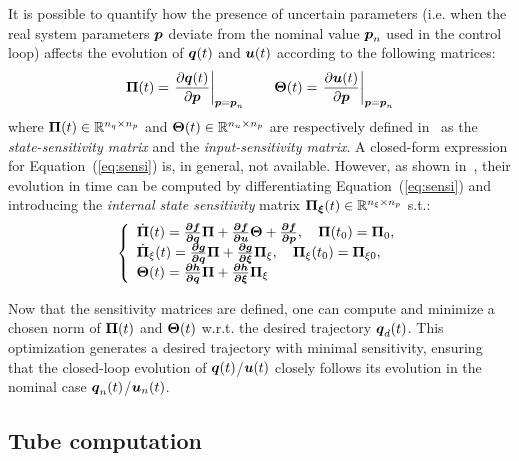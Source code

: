It is possible to quantify how the presence of uncertain parameters (i.e. when the real system parameters $\boldsymbol{p}$ deviate from the nominal value $\boldsymbol{p}_n$ used in the control loop) affects the evolution of $\boldsymbol{q}(t)$ and $\boldsymbol{u}(t)$ according to the following matrices:
\begin{equation}\label{eq:sensi}
  \boldsymbol{\Pi}(t)=\left.\frac{\partial \boldsymbol{q}(t)}{\partial \boldsymbol{p}}\right|_{\boldsymbol{p}=\boldsymbol{p}_n} \quad\quad \boldsymbol{\Theta}(t)=\left.\frac{\partial \boldsymbol{u}(t)}{\partial \boldsymbol{p}}\right|_{\boldsymbol{p}=\boldsymbol{p}_n}
\end{equation}
where $\boldsymbol{\Pi}(t)\in \mathbb{R}^{n_q \times n_p}$ and $\boldsymbol{\Theta}(t)\in \mathbb{R}^{n_u \times n_p}$ are respectively defined in~\cite{cPi,cTh} as the \emph{state-sensitivity matrix} and the \emph{input-sensitivity matrix}.
A closed-form expression for Equation~(\ref{eq:sensi}) is, in general, not available. 
However, as shown in~\cite{cPi,cTh}, their evolution in time can be computed by differentiating Equation~(\ref{eq:sensi}) and introducing the \emph{internal state sensitivity} matrix $\boldsymbol{\Pi_{\xi}}(t)\in \mathbb{R}^{n_{\xi} \times n_p}$ s.t.:
\begin{equation}\label{eq:dyna_sensi}
  \left \{
  \begin{array}{l l l}
       \dot{\boldsymbol{\Pi}}(t) = \boldsymbol{\frac{\partial{f}}{\partial{q}}}\boldsymbol{\Pi}+ \boldsymbol{\frac{\partial{f}}{\partial{u}}}\boldsymbol{\Theta}+ \boldsymbol{\frac{\partial{f}}{\partial{p}}}, \quad \boldsymbol{\Pi}(t_0)=\boldsymbol{\Pi}_0, \\
       \dot{\boldsymbol{\Pi}}_{\xi}(t) = \boldsymbol{\frac{\partial{g}}{\partial{q}}}\boldsymbol{\Pi}+ \boldsymbol{\frac{\partial{g}}{\partial{\xi}}}\boldsymbol{\Pi}_{\xi}, \quad \boldsymbol{\Pi}_{\xi}(t_0)=\boldsymbol{\Pi}_{\xi0}, \\
       \boldsymbol{\Theta}(t) = \boldsymbol{\frac{\partial{h}}{\partial{q}}}\boldsymbol{\Pi}+ \boldsymbol{\frac{\partial{h}}{\partial{\xi}}}\boldsymbol{\Pi}_{\xi} 
  \end{array}
  \right .
\end{equation}

Now that the sensitivity matrices are defined, one can compute and minimize a chosen norm of $\boldsymbol{\Pi}(t)$ and $\boldsymbol{\Theta}(t)$ w.r.t. the desired trajectory $\boldsymbol{q}_d(t)$. 
This optimization generates a desired trajectory with minimal sensitivity, ensuring that the closed-loop evolution of $\boldsymbol{q}(t)$/$\boldsymbol{u}(t)$ closely follows its evolution in the nominal case $\boldsymbol{q}_n(t)$/$\boldsymbol{u}_n(t)$.

\subsection{Tube computation}

